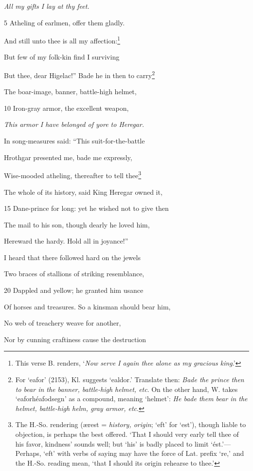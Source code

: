 \emph{All my gifts I lay
at thy feet.}

5
Atheling of earlmen, offer them gladly.

And still unto thee is all my affection:\footnote{This verse B. renders, ‘\emph{Now serve I again thee alone as my gracious king}.’}

But few of my folk-kin find I surviving

But thee, dear Higelac!” Bade he in then to carry\footnote{For ‘eafor’ (2153), Kl. suggests ‘ealdor.’ Translate then: \emph{Bade the
prince then to bear in the banner, battle-high helmet, etc}. On the other hand,
W. takes ‘eaforhéafodsegn’ as a compound, meaning ‘helmet’: \emph{He bade them
bear in the helmet, battle-high helm, gray armor, etc}.}

The boar-image, banner, battle-high helmet,

10
Iron-gray armor, the excellent weapon,

\emph{This armor I have
belonged of yore to
Heregar.}

In song-measures said: “This suit-for-the-battle

Hrothgar presented me, bade me expressly,

Wise-mooded atheling, thereafter to tell thee\footnote{The H.-So. rendering (ærest = \emph{history, origin}; ‘eft’ for ‘est’), though
liable to objection, is perhaps the best offered. ‘That I should very early tell
thee of his favor, kindness’ sounds well; but ‘his’ is badly placed to limit
‘ést.’—Perhaps, ‘eft’ with verbs of saying may have the force of Lat. prefix
‘re,’ and the H.-So. reading mean, ‘that I should its origin rehearse to thee.’}

The whole of its history, said King Heregar owned it,

15
Dane-prince for long: yet he wished not to give then

The mail to his son, though dearly he loved him,

Hereward the hardy. Hold all in joyance!”

I heard that there followed hard on the jewels

Two braces of stallions of striking resemblance,

20
Dappled and yellow; he granted him usance

Of horses and treasures. So a kinsman should bear him,

No web of treachery weave for another,

Nor by cunning craftiness cause the destruction

